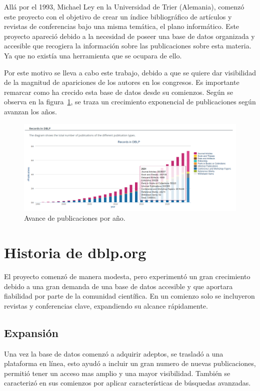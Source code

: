 \documentclass[a4paper, 12pt]{book}
\begin{document}
Allá por el 1993, Michael Ley en la Universidad de Trier (Alemania), comenzó este proyecto con el objetivo de crear un índice bibliográfico de artículos y revistas de conferencias bajo una misma temática, el plano informático. Este proyecto apareció debido a la necesidad de poseer una base de datos organizada y accesible que recogiera la información sobre las publicaciones sobre esta materia. Ya que no existía una herramienta que se ocupara de ello.

Por este motivo se lleva a cabo este trabajo, debido a que se quiere dar visibilidad de la magnitud de apariciones de los autores en los congresos. Es importante remarcar como ha crecido esta base de datos desde su comienzos. Según se observa en la figura~\ref{figura:progresion_base_dblp}, se traza un crecimiento exponencial de publicaciones según avanzan los años.

\begin{figure}[h]
    \centering
    \includegraphics[width=16cm, keepaspectratio]{img/dblp_total_publications_per_year.png}
    \caption{Avance de publicaciones por año.}
    \label{figura:progresion_base_dblp}
 \end{figure}


\section{Historia de dblp.org}
\label{sec:seccion}

El proyecto comenzó de manera modesta, pero experimentó un gran crecimiento debido a una gran demanda de una base de datos accesible y que aportara fiabilidad por parte de la comunidad científica. En un comienzo solo se incluyeron revistas y conferencias clave, expandiendo su alcance rápidamente.

\subsection{Expansión}
Una vez la base de datos comenzó a adquirir adeptos, se trasladó a una plataforma en línea, esto ayudó a incluir un gran numero de nuevas publicaciones, permitió tener un acceso mas amplio y una mayor visibilidad. También se caracterizó en sus comienzos por aplicar características de búsquedas avanzadas.
\end{document}
